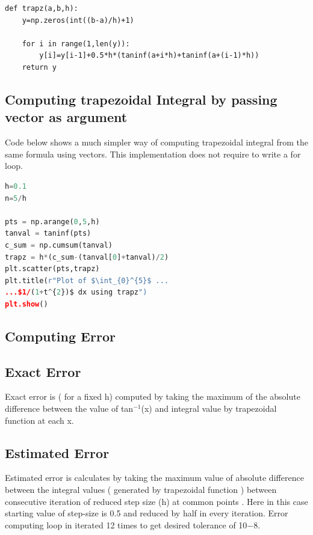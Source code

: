 \documentclass[letterpaper, 12pt]{article}
\begin{document}
\begin{lstlisting}
def trapz(a,b,h):
    y=np.zeros(int((b-a)/h)+1)
    
    for i in range(1,len(y)):
        y[i]=y[i-1]+0.5*h*(taninf(a+i*h)+taninf(a+(i-1)*h))
    return y
\end{lstlisting}
\begin{multicols}{2}
\subsection{Computing trapezoidal Integral by passing vector as argument}
Code below shows a much simpler way of computing trapezoidal integral from the same formula using vectors. This implementation does not require to write a for loop.
\end{multicols}
\begin{lstlisting}[language=Python , caption=Comparing Quad function integal with actual value of tan$^{-1}$(x)]
h=0.1
n=5/h

pts = np.arange(0,5,h)
tanval = taninf(pts)
c_sum = np.cumsum(tanval)
trapz = h*(c_sum-(tanval[0]+tanval)/2)
plt.scatter(pts,trapz)
plt.title(r"Plot of $\int_{0}^{5}$ ...
...$1/(1+t^{2})$ dx using trapz")
plt.show()
\end{lstlisting}
\begin{multicols}{2}
\section{Computing Error}
\subsection{Exact Error}
Exact error is ( for a fixed h) computed by taking the maximum of the absolute difference between the value of tan$^{-1}$(x) and integral value by trapezoidal function at each x.
\subsection{Estimated Error}
Estimated error is calculates by taking the maximum value of absolute difference between the integral values ( generated by trapezoidal function ) between consecutive iteration of reduced step size (h) at common points . Here in this case starting value of step-size is 0.5 and reduced by half in every iteration. Error computing loop in iterated 12 times to get desired tolerance of 10${-8}$.
\end{multicols}
\end{document}
